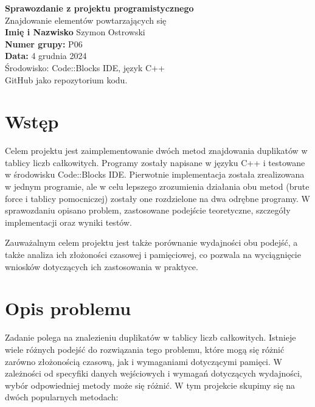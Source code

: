\documentclass[a4paper,12pt]{article}
\begin{document}
\begin{titlepage}
    \centering
    \vspace*{1cm}
    
    {\Huge \textbf{Sprawozdanie z projektu programistycznego}}\\[1cm]
    
    {\LARGE Znajdowanie elementów powtarzających się}\\[1cm]
    
    \vspace{1cm}
    \textbf{Imię i Nazwisko} Szymon Ostrowski \\
    \textbf{Numer grupy:} P06\\
    \textbf{Data:} 4 grudnia 2024\\
    
    \vfill
    {\large Środowisko: Code::Blocks IDE, język C++}\\
    \vspace{0.5cm}
    {\large GitHub jako repozytorium kodu.}\\
    
    \vfill
\end{titlepage}

\newpage
\tableofcontents
\newpage

\section{Wstęp}
Celem projektu jest zaimplementowanie dwóch metod znajdowania duplikatów w tablicy liczb całkowitych. Programy zostały napisane w języku C++ i testowane w środowisku Code::Blocks IDE. Pierwotnie implementacja została zrealizowana w jednym programie, ale w celu lepszego zrozumienia działania obu metod (brute force i tablicy pomocniczej) zostały one rozdzielone na dwa odrębne programy. W sprawozdaniu opisano problem, zastosowane podejście teoretyczne, szczegóły implementacji oraz wyniki testów.

Zauważalnym celem projektu jest także porównanie wydajności obu podejść, a także analiza ich złożoności czasowej i pamięciowej, co pozwala na wyciągnięcie wniosków dotyczących ich zastosowania w praktyce.

\section{Opis problemu}
Zadanie polega na znalezieniu duplikatów w tablicy liczb całkowitych. Istnieje wiele różnych podejść do rozwiązania tego problemu, które mogą się różnić zarówno złożonością czasową, jak i wymaganiami dotyczącymi pamięci. W zależności od specyfiki danych wejściowych i wymagań dotyczących wydajności, wybór odpowiedniej metody może się różnić. W tym projekcie skupimy się na dwóch popularnych metodach:
\end{document}
